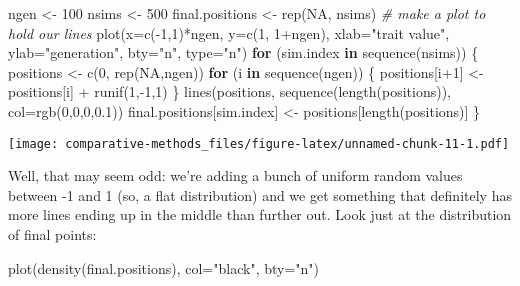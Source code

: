 \documentclass[
]{article}
\newenvironment{Shaded}{\begin{snugshade}}{\end{snugshade}}
\newcommand{\AttributeTok}[1]{\textcolor[rgb]{0.77,0.63,0.00}{#1}}
\newcommand{\CommentTok}[1]{\textcolor[rgb]{0.56,0.35,0.01}{\textit{#1}}}
\newcommand{\ConstantTok}[1]{\textcolor[rgb]{0.00,0.00,0.00}{#1}}
\newcommand{\ControlFlowTok}[1]{\textcolor[rgb]{0.13,0.29,0.53}{\textbf{#1}}}
\newcommand{\DecValTok}[1]{\textcolor[rgb]{0.00,0.00,0.81}{#1}}
\newcommand{\FloatTok}[1]{\textcolor[rgb]{0.00,0.00,0.81}{#1}}
\newcommand{\FunctionTok}[1]{\textcolor[rgb]{0.00,0.00,0.00}{#1}}
\newcommand{\NormalTok}[1]{#1}
\newcommand{\OtherTok}[1]{\textcolor[rgb]{0.56,0.35,0.01}{#1}}
\newcommand{\SpecialCharTok}[1]{\textcolor[rgb]{0.00,0.00,0.00}{#1}}
\newcommand{\StringTok}[1]{\textcolor[rgb]{0.31,0.60,0.02}{#1}}
\begin{document}
\begin{Shaded}
\begin{Highlighting}[]
\NormalTok{ngen }\OtherTok{\textless{}{-}} \DecValTok{100}
\NormalTok{nsims }\OtherTok{\textless{}{-}} \DecValTok{500}
\NormalTok{final.positions }\OtherTok{\textless{}{-}} \FunctionTok{rep}\NormalTok{(}\ConstantTok{NA}\NormalTok{, nsims)}
\CommentTok{\# make a plot to hold our lines}
\FunctionTok{plot}\NormalTok{(}\AttributeTok{x=}\FunctionTok{c}\NormalTok{(}\SpecialCharTok{{-}}\DecValTok{1}\NormalTok{,}\DecValTok{1}\NormalTok{)}\SpecialCharTok{*}\NormalTok{ngen, }\AttributeTok{y=}\FunctionTok{c}\NormalTok{(}\DecValTok{1}\NormalTok{, }\DecValTok{1}\SpecialCharTok{+}\NormalTok{ngen), }\AttributeTok{xlab=}\StringTok{"trait value"}\NormalTok{, }\AttributeTok{ylab=}\StringTok{"generation"}\NormalTok{, }\AttributeTok{bty=}\StringTok{"n"}\NormalTok{, }\AttributeTok{type=}\StringTok{"n"}\NormalTok{)}
\ControlFlowTok{for}\NormalTok{ (sim.index }\ControlFlowTok{in} \FunctionTok{sequence}\NormalTok{(nsims)) \{}
\NormalTok{  positions }\OtherTok{\textless{}{-}} \FunctionTok{c}\NormalTok{(}\DecValTok{0}\NormalTok{, }\FunctionTok{rep}\NormalTok{(}\ConstantTok{NA}\NormalTok{,ngen))}
  \ControlFlowTok{for}\NormalTok{ (i }\ControlFlowTok{in} \FunctionTok{sequence}\NormalTok{(ngen)) \{}
\NormalTok{    positions[i}\SpecialCharTok{+}\DecValTok{1}\NormalTok{] }\OtherTok{\textless{}{-}}\NormalTok{ positions[i] }\SpecialCharTok{+} \FunctionTok{runif}\NormalTok{(}\DecValTok{1}\NormalTok{,}\SpecialCharTok{{-}}\DecValTok{1}\NormalTok{,}\DecValTok{1}\NormalTok{)}
\NormalTok{  \}}
  \FunctionTok{lines}\NormalTok{(positions, }\FunctionTok{sequence}\NormalTok{(}\FunctionTok{length}\NormalTok{(positions)), }\AttributeTok{col=}\FunctionTok{rgb}\NormalTok{(}\DecValTok{0}\NormalTok{,}\DecValTok{0}\NormalTok{,}\DecValTok{0}\NormalTok{,}\FloatTok{0.1}\NormalTok{))}
\NormalTok{  final.positions[sim.index] }\OtherTok{\textless{}{-}}\NormalTok{ positions[}\FunctionTok{length}\NormalTok{(positions)]}
\NormalTok{\}}
\end{Highlighting}
\end{Shaded}

\texttt{[image: comparative-methods\_files/figure-latex/unnamed-chunk-11-1.pdf]}

Well, that may seem odd: we're adding a bunch of uniform random values between -1 and 1 (so, a flat distribution) and we get something that definitely has more lines ending up in the middle than further out. Look just at the distribution of final points:

\begin{Shaded}
\begin{Highlighting}[]
\FunctionTok{plot}\NormalTok{(}\FunctionTok{density}\NormalTok{(final.positions), }\AttributeTok{col=}\StringTok{"black"}\NormalTok{, }\AttributeTok{bty=}\StringTok{"n"}\NormalTok{)}
\end{Highlighting}
\end{Shaded}
\end{document}
